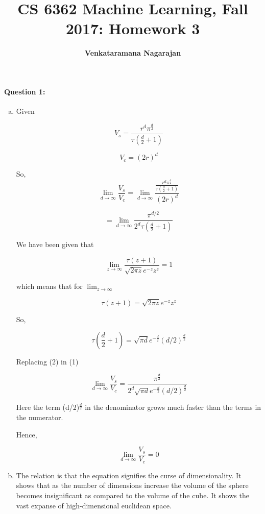 \documentclass[letterpaper,11pt]{article}
\title{CS 6362 Machine Learning, Fall 2017: Homework 3}
\date{}
\author{\bf Venkataramana Nagarajan}
\begin{document}
\maketitle

\paragraph{Question 1:} 
\begin{enumerate}[(a)]
\item

Given

\[
	V_s = \frac{r^d\pi^{\frac{d}{2}}}{\tau(\frac{d}{2}+1)}
\]

\[
	V_c = (2r)^d
\]

So, 
\[
	\lim_{d\to\infty} \frac{V_s}{V_c} = \lim_{d\to\infty} \frac{\frac{r^d\pi^{\frac{d}{2}}}{\tau(\frac{d}{2}+1)}}{(2r)^d}
\]


\[
	= \lim_{d\to\infty} \frac{\pi^{d/2}}{2^d\tau(\frac{d}{2}+1)}  \tag{1}
\]



We have been given that

\[
	\lim_{z\to\infty} \frac{\tau(z+1)}{\sqrt{2{\pi}z}e^{-z}z^z} = 1
\]

which means that for $\lim_{z\to\infty}$

\[
	\tau(z+1) = {\sqrt{2{\pi}z}e^{-z}z^z}
\]

So,

\[
	\tau(\frac{d}{2}+1) = \sqrt{{\pi}d}e^{-\frac{d}{2}}(d/2)^{\frac{d}{2}}  \tag{2}
\]

Replacing (2) in (1)

\[
	\lim_{d\to\infty} \frac{V_s}{V_c} = \frac{\pi^{\frac{d}{2}}}{2^d\sqrt{{\pi}d}e^{-\frac{d}{2}}(d/2)^{\frac{d}{2}}}
\]

Here the term (d/2)$^\frac{d}{2}$ in the denominator grows much faster than the terms in the numerator.

Hence, 

\[
	\lim_{d\to\infty} \frac{V_s}{V_c} = 0
\]

\item

The relation is that the equation signifies the curse of dimensionality. It shows that as the number of dimensions increase the volume of the sphere becomes insignificant as compared to the volume of the cube. It shows the vast expanse of high-dimensional euclidean space.

\end{enumerate}
\end{document}
